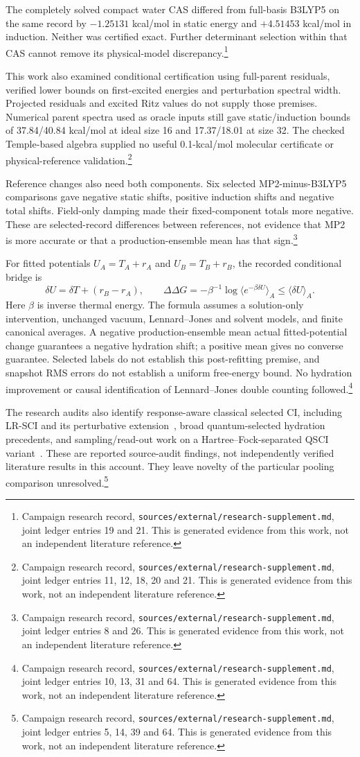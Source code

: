 \documentclass{article}
\newcommand{\record}[1]{\footnote{Campaign research record, \texttt{sources/external/research-supplement.md}, #1. This is generated evidence from this work, not an independent literature reference.}}
\begin{document}
The completely solved compact water CAS differed from full-basis B3LYP5 on the same record by \(-1.25131\) kcal/mol in static energy and \(+4.51453\) kcal/mol in induction. Neither was certified exact. Further determinant selection within that CAS cannot remove its physical-model discrepancy.\record{joint ledger entries 19 and 21}

This work also examined conditional certification using full-parent residuals, verified lower bounds on first-excited energies and perturbation spectral width. Projected residuals and excited Ritz values do not supply those premises. Numerical parent spectra used as oracle inputs still gave static/induction bounds of 37.84/40.84 kcal/mol at ideal size 16 and 17.37/18.01 at size 32. The checked Temple-based algebra supplied no useful 0.1-kcal/mol molecular certificate or physical-reference validation.\record{joint ledger entries 11, 12, 18, 20 and 21}

Reference changes also need both components. Six selected MP2-minus-B3LYP5 comparisons gave negative static shifts, positive induction shifts and negative total shifts. Field-only damping made their fixed-component totals more negative. These are selected-record differences between references, not evidence that MP2 is more accurate or that a production-ensemble mean has that sign.\record{joint ledger entries 8 and 26}

For fitted potentials \(U_A=T_A+r_A\) and \(U_B=T_B+r_B\), the recorded conditional bridge is
\[
 \delta U=\delta T+(r_B-r_A),\qquad
 \Delta\Delta G=-\beta^{-1}\log\langle e^{-\beta\delta U}\rangle_A
 \leq\langle\delta U\rangle_A.
\]
Here \(\beta\) is inverse thermal energy. The formula assumes a solution-only intervention, unchanged vacuum, Lennard--Jones and solvent models, and finite canonical averages. A negative production-ensemble mean actual fitted-potential change guarantees a negative hydration shift; a positive mean gives no converse guarantee. Selected labels do not establish this post-refitting premise, and snapshot RMS errors do not establish a uniform free-energy bound. No hydration improvement or causal identification of Lennard--Jones double counting followed.\record{joint ledger entries 10, 13, 31 and 64}

The research audits also identify response-aware classical selected CI, including LR-SCI and its perturbative extension~\cite{LR,LRPT}, broad quantum-selected hydration precedents, and sampling/read-out work on a Hartree--Fock-separated QSCI variant~\cite{readout}. These are reported source-audit findings, not independently verified literature results in this account. They leave novelty of the particular pooling comparison unresolved.\record{joint ledger entries 5, 14, 39 and 64}
\end{document}
